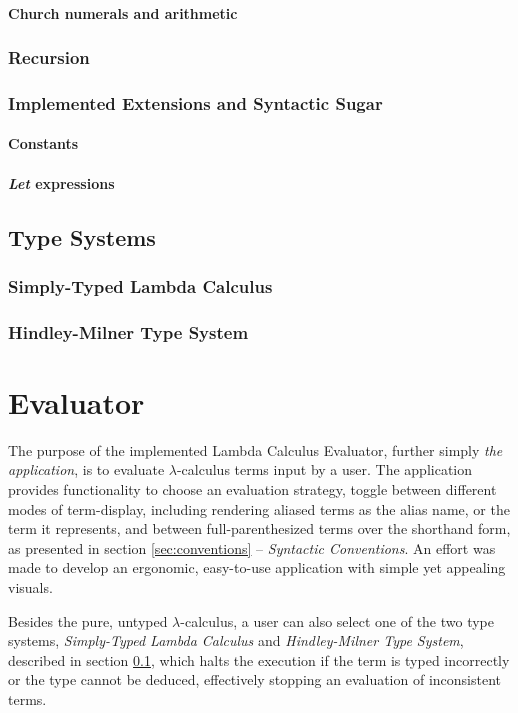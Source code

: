 \documentclass[a4paper,10pt]{article}
\begin{document}
\paragraph{Church numerals and arithmetic} \label{encoding}
\subsubsection{Recursion}
\subsubsection{Implemented Extensions and Syntactic Sugar}
\paragraph{Constants}
\paragraph{\textit{Let} expressions}
\subsection{Type Systems} \label{sec:types}
\subsubsection{Simply-Typed Lambda Calculus}
\subsubsection{Hindley-Milner Type System}

\section{Evaluator}
The purpose of the implemented Lambda Calculus Evaluator,
further simply \textit{the application}, is to evaluate $\lambda$-calculus
terms input by a user.
The application provides functionality to
choose an evaluation strategy, toggle between different modes
of term-display, including rendering aliased terms as the alias name,
or the term it represents, and between full-parenthesized terms over
the shorthand form, as presented in section \ref{sec:conventions} -- \textit{Syntactic Conventions}.
An effort was made to develop an ergonomic, easy-to-use application with 
simple yet appealing visuals.

Besides the pure, untyped $\lambda$-calculus, a user can also select one of the two
type systems, \textit{Simply-Typed Lambda Calculus} and \textit{Hindley-Milner Type System},
described in section \ref{sec:types}, which halts the execution if the term is typed incorrectly or the type cannot
be deduced, effectively stopping an evaluation of inconsistent terms.
\end{document}
